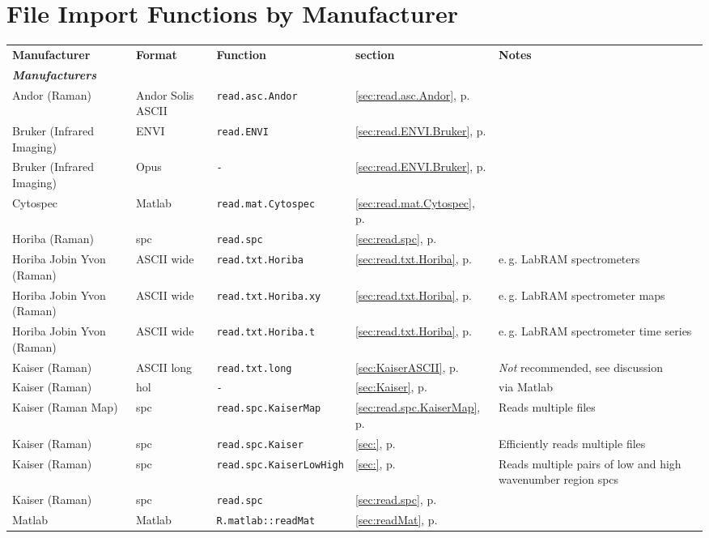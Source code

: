 \documentclass[english, a4paper, 10pt, headings=small, DIV11]{scrartcl}
\newcommand{\Rfunction}[2][]{\texorpdfstring{\nohyphens{#1\texttt{#2}}}{#2}}
\begin{document}
\section{File Import  Functions by Manufacturer}
\label{sec:manufacturer}
\begin{footnotesize}
\begin{tabular}{@{} l l l l >{\raggedright}p{3.4cm}}
  \textbf{Manufacturer} &
  \textbf{Format} &
  \textbf{Function} &
  \textbf{section}  &
  \textbf{Notes}\tabularnewline
\multicolumn{4}{l}{\emph{\textbf{Manufacturers}}}\tabularnewline
Andor (Raman)&Andor Solis ASCII & \Rfunction{read.asc.Andor} & \ref{sec:read.asc.Andor}, p. \pageref{sec:read.asc.Andor} & \tabularnewline
Bruker (Infrared Imaging)&ENVI & \Rfunction{read.ENVI} & \ref{sec:read.ENVI.Bruker}, p. \pageref{sec:read.ENVI.Bruker} & \tabularnewline
Bruker (Infrared Imaging)&Opus & \Rfunction{-} & \ref{sec:read.ENVI.Bruker}, p. \pageref{sec:read.ENVI.Bruker} & \tabularnewline
Cytospec&Matlab & \Rfunction{read.mat.Cytospec} & \ref{sec:read.mat.Cytospec}, p. \pageref{sec:read.mat.Cytospec} & \tabularnewline
Horiba (Raman)&spc & \Rfunction{read.spc} & \ref{sec:read.spc}, p. \pageref{sec:read.spc} & \tabularnewline
Horiba Jobin Yvon (Raman)&ASCII wide & \Rfunction{read.txt.Horiba} & \ref{sec:read.txt.Horiba}, p. \pageref{sec:read.txt.Horiba} & e.\,g. LabRAM spectrometers\tabularnewline
Horiba Jobin Yvon (Raman)&ASCII wide & \Rfunction{read.txt.Horiba.xy} & \ref{sec:read.txt.Horiba}, p. \pageref{sec:read.txt.Horiba} & e.\,g. LabRAM spectrometer maps\tabularnewline
Horiba Jobin Yvon (Raman)&ASCII wide & \Rfunction{read.txt.Horiba.t} & \ref{sec:read.txt.Horiba}, p. \pageref{sec:read.txt.Horiba} & e.\,g. LabRAM spectrometer time series\tabularnewline
Kaiser (Raman)&ASCII long & \Rfunction{read.txt.long} & \ref{sec:KaiserASCII}, p. \pageref{sec:KaiserASCII} & \emph{Not} recommended, see discussion\tabularnewline
Kaiser (Raman)&hol & \Rfunction{-} & \ref{sec:Kaiser}, p. \pageref{sec:Kaiser} & via Matlab\tabularnewline
Kaiser (Raman Map)&spc & \Rfunction{read.spc.KaiserMap} & \ref{sec:read.spc.KaiserMap}, p. \pageref{sec:read.spc.KaiserMap} & Reads multiple files\tabularnewline
Kaiser (Raman)&spc & \Rfunction{read.spc.Kaiser} & \ref{sec:}, p. \pageref{sec:} & Efficiently reads multiple files\tabularnewline
Kaiser (Raman)&spc & \Rfunction{read.spc.KaiserLowHigh} & \ref{sec:}, p. \pageref{sec:} & Reads multiple pairs of low and high wavenumber region spcs\tabularnewline
Kaiser (Raman)&spc & \Rfunction{read.spc} & \ref{sec:read.spc}, p. \pageref{sec:read.spc} & \tabularnewline
Matlab&Matlab & \Rfunction{R.matlab::readMat} & \ref{sec:readMat}, p. \pageref{sec:readMat} & \tabularnewline

\end{tabular}
\end{footnotesize}
\end{document}
